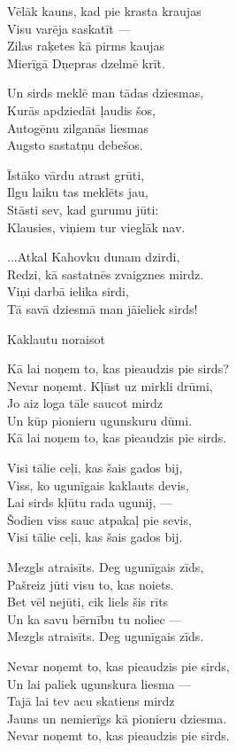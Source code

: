 \documentclass[14pt]{extarticle}
\begin{document}
{Vēlāk kauns, kad pie krasta kraujas\\
Visu varēja saskatīt ---\\
Zilas raķetes kā pirms kaujas\\
Mierīgā Dņepras dzelmē krīt.

Un sirds meklē man tādas dziesmas,\\
Kurās apdziedāt ļaudis šos,\\
Autogēnu zilganās liesmas\\
Augsto sastatņu debešos.

Īstāko vārdu atrast grūti,\\
Ilgu laiku tas meklēts jau,\\
Stāsti sev, kad gurumu jūti:\\
Klausies, viņiem tur vieglāk nav.

...Atkal Kahovku dunam dzirdi,\\
Redzi, kā sastatnēs zvaigznes mirdz.\\
Viņi darbā ielika sirdi,\\
Tā savā dziesmā man jāieliek sirds!

\newpage

{\large \sc Kaklautu noraisot}

Kā lai noņem to, kas pieaudzis pie sirds?\\
Nevar noņemt. Kļūst uz mirkli drūmi,\\
Jo aiz loga tāle saucot mirdz\\
Un kūp pionieru ugunskuru dūmi.\\
Kā lai noņem to, kas pieaudzis pie sirds.

Visi tālie ceļi, kas šais gados bij,\\
Viss, ko ugunīgais kaklauts devis,\\
Lai sirds kļūtu rada ugunij, ---\\
Šodien viss sauc atpakaļ pie sevis,\\
Visi tālie ceļi, kas šais gados bij.

Mezgls atraisīts. Deg ugunīgais zīds,\\
Pašreiz jūti visu to, kas noiets.\\
Bet vēl nejūti, cik liels šis rīts\\
Un ka savu bērnību tu noliec ---\\
Mezgls atraisīts. Deg ugunīgais zīds.

Nevar noņemt to, kas pieaudzis pie sirds,\\
Un lai paliek ugunskura liesma ---\\
Tajā lai tev acu skatiens mirdz\\
Jauns un nemierīgs kā pionieru dziesma.\\
Nevar noņemt to, kas pieaudzis pie sirds.

}
\end{document}
